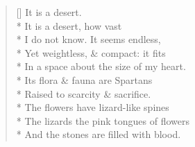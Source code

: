 \label{ch:anatomy}
\settowidth{\versewidth}{The lizards the pink tongues of flowers}
\begin{verse}[\versewidth]
It is a desert.\\*
It is a desert, how vast\\*
I do not know. It seems endless, \\*
Yet weightless, \& compact: it fits\\*
In a space about the size of my heart. \\*
Its flora \& fauna are Spartans\\*
Raised to scarcity \& sacrifice.\\*
The flowers have lizard-like spines\\*
The lizards the pink tongues of flowers\\*
And the stones are filled with blood.
\end{verse}
